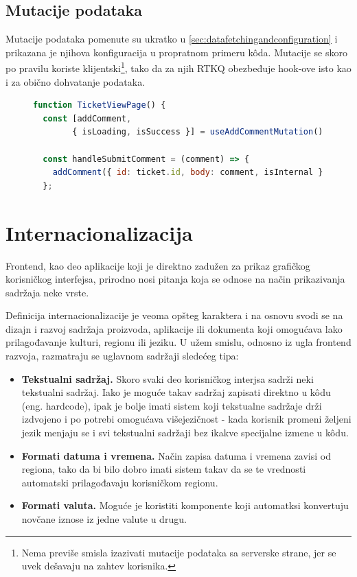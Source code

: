 \documentclass[12pt,oneside]{memoir}
\begin{document}
\newpage
\subsection{Mutacije podataka}

Mutacije podataka pomenute su ukratko u \ref{sec:datafetchingandconfiguration} i prikazana je njihova konfiguracija u propratnom primeru k\^{o}da. Mutacije se skoro po pravilu koriste klijentski\footnote{Nema previše smisla izazivati mutacije podataka sa serverske strane, jer se uvek dešavaju na zahtev korisnika.}, tako da za njih RTKQ obezbeđuje hook-ove isto kao i za obično dohvatanje podataka.

\begin{figure}[h]
\begin{lstlisting}[language=JavaScript, style=ES6, caption={Korišćenje RTKQ mutacija na primeru dodavanja komentara na tiket.}]
function TicketViewPage() {
  const [addComment,
        { isLoading, isSuccess }] = useAddCommentMutation();

  const handleSubmitComment = (comment) => {
    addComment({ id: ticket.id, body: comment, isInternal });
  };
\end{lstlisting}
\end{figure}


\section{Internacionalizacija}
\label{sec:intl}

Frontend, kao deo aplikacije koji je direktno zadužen za prikaz grafičkog korisničkog interfejsa, prirodno nosi pitanja koja se odnose na način prikazivanja sadržaja neke vrste. 

Definicija internacionalizacije je veoma opšteg karaktera i na osnovu \cite{i18n} svodi se na dizajn i razvoj sadržaja proizvoda, aplikacije ili dokumenta koji omogućava lako prilagođavanje kulturi, regionu ili jeziku. U užem smislu, odnosno iz ugla frontend razvoja, razmatraju se uglavnom sadržaji sledećeg tipa:

\begin{itemize}
    \item \textbf{Tekstualni sadržaj.} Skoro svaki deo korisničkog interjsa sadrži neki tekstualni sadržaj. Iako je moguće takav sadržaj zapisati direktno u k\^{o}du (eng. hardcode), ipak je bolje imati sistem koji tekstualne sadržaje drži izdvojeno i po potrebi omogućava višejezičnost - kada korisnik promeni željeni jezik menjaju se i svi tekstualni sadržaji bez ikakve specijalne izmene u k\^{o}du.
    \item \textbf{Formati datuma i vremena.} Način zapisa datuma i vremena zavisi od regiona, tako da bi bilo dobro imati sistem takav da se te vrednosti automatski prilagođavaju korisničkom regionu.
    \item \textbf{Formati valuta.} Moguće je koristiti komponente koji automatksi konvertuju novčane iznose iz jedne valute u drugu.
\end{itemize}
\end{document}
